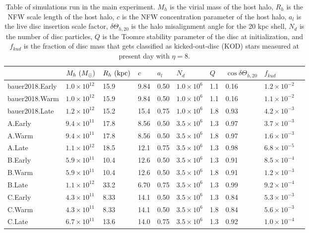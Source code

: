 \begin{table}
\centering
\caption{Table of simulations run in the main experiment. $M_h$ is the
  virial mass of the host halo, $R_h$ is the NFW scale length of the
  host halo, $c$ is the NFW concentration parameter of the host halo,
  $a_l$ is the live disc insertion scale factor, $\delta
  \Theta_{h,20}$ is the halo misalignment angle for the 20 kpc shell,
  $N_d$ is the number of disc particles, $Q$ is the Toomre stability
  parameter of the disc at initialization, and $f_{kud}$ is the
  fraction of disc mass that gets classified as kicked-out-disc (KOD)
  stars measured at present day with $\eta=8$.} \label{tab:sims_iii}
\begin{tabular}{l l l l l l l l l l}
\hline
       & $M_h\,\,(M_\odot)$ & $R_h\,\,(\text{kpc})$ & $c$ & $a_l$ &  $N_d$ & $Q$ & $\cos\delta \Theta_{h,20}$ & $f_{kud}$\\
\hline
bauer2018.Early   & $1.0 \times 10^{12}$ & 15.9 &  9.84 &   0.50 & $1.0 \times 10^6$ & 1.1 & 0.16 & $1.2 \times 10^{-2}$\\
bauer2018.Warm    & $1.0 \times 10^{12}$ & 15.9 &  9.84 &   0.50 & $1.0 \times 10^6$ & 1.1 & 0.16 & $1.1 \times 10^{-2}$\\
bauer2018.Late    & $1.2 \times 10^{12}$ & 15.2 &  15.4 &   0.75 & $1.0 \times 10^6$ & 1.8 & 0.93 &$4.2 \times 10^{-3}$\\
A.Early           & $9.4 \times 10^{11}$ & 17.8 &  8.56 &   0.50 & $3.5 \times 10^6$ & 1.3 & 0.97 &$3.7 \times 10^{-3}$\\
A.Warm            & $9.4 \times 10^{11}$ & 17.8 &  8.56 &   0.50 & $3.5 \times 10^6$ & 1.8 & 0.97 & $1.6 \times 10^{-3}$\\
A.Late            & $1.1 \times 10^{12}$ & 18.5 &  12.1 &   0.75 & $3.5 \times 10^6$ & 1.3 & 0.98 & $6.8 \times 10^{-5}$\\
B.Early           & $5.9 \times 10^{11}$ & 10.4 &  12.6 &   0.50 & $3.5 \times 10^6$ & 1.3 & 0.91 & $8.5 \times 10^{-4}$\\
B.Warm            & $5.9 \times 10^{11}$ & 10.4 &  12.6 &   0.50 & $3.5 \times 10^6$ & 1.8 & 0.91 & $1.2 \times 10^{-3}$\\
B.Late            & $1.1 \times 10^{12}$ & 33.2 &  6.70 &   0.75 & $3.5 \times 10^6$ & 1.3 & 0.99 & $9.2 \times 10^{-4}$\\
C.Early           & $4.3 \times 10^{11}$ & 8.33 &  14.1 &   0.50 & $3.5 \times 10^6$ & 1.3 & 0.84 & $5.3 \times 10^{-3}$\\
C.Warm            & $4.3 \times 10^{11}$ & 8.33 &  14.1 &   0.50 & $3.5 \times 10^6$ & 1.8 & 0.84 & $5.6 \times 10^{-3}$\\
C.Late            & $6.7 \times 10^{11}$ & 13.6 &  14.0 &   0.75 & $3.5 \times 10^6$ & 1.3 & 0.92 & $1.0 \times 10^{-4}$\\
\hline
\end{tabular} 

\end{table}

